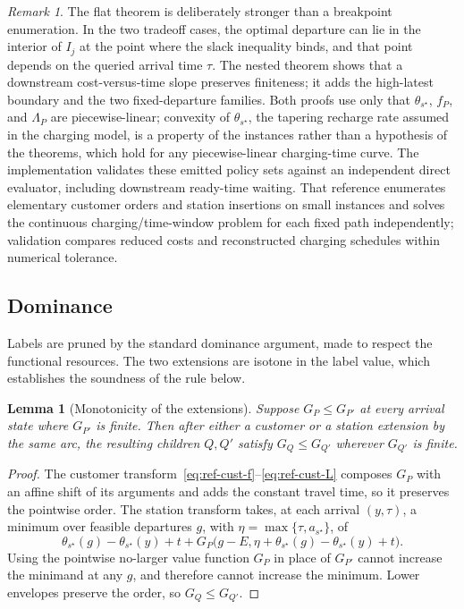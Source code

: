\documentclass[review,3p,authoryear]{elsarticle}
\theoremstyle{plain}
\newtheorem{lemma}{Lemma}
\theoremstyle{definition}
\theoremstyle{remark}
\newtheorem{remark}{Remark}
\begin{document}
\begin{remark}
The flat theorem is deliberately stronger than a breakpoint enumeration. In the two
tradeoff cases, the optimal departure can lie in the interior of $I_j$ at the point
where the slack inequality binds, and that point depends on the queried arrival time
$\tau$. The nested theorem shows that a downstream cost-versus-time slope preserves
finiteness; it adds the high-latest boundary and the two fixed-departure
families. Both proofs use only that $\theta_{s^\star}$, $f_P$, and $\Lambda_P$ are
piecewise-linear; convexity of $\theta_{s^\star}$, the tapering recharge rate assumed in
the charging model, is a property of the instances rather than a hypothesis of the
theorems, which hold for any piecewise-linear charging-time curve. The implementation
validates these emitted policy sets against an
independent direct evaluator, including downstream ready-time waiting. That
reference enumerates elementary customer orders and station insertions on small
instances and solves the continuous charging/time-window problem for each fixed
path independently; validation compares reduced costs and reconstructed charging
schedules within numerical tolerance.
\end{remark}

\subsection{Dominance}
\label{sec:dominance}

Labels are pruned by the standard dominance argument, made to respect the functional
resources. The two extensions are isotone in the label value, which establishes the
soundness of the rule below.

\begin{lemma}[Monotonicity of the extensions]
\label{lem:monotone}
Suppose $G_P\le G_{P'}$ at every arrival state where $G_{P'}$ is finite. Then after either
a customer or a station extension by the same arc, the resulting children $Q,Q'$ satisfy
$G_Q\le G_{Q'}$ wherever $G_{Q'}$ is finite.
\end{lemma}

\begin{proof}
The customer transform~\eqref{eq:ref-cust-f}--\eqref{eq:ref-cust-L} composes $G_P$ with an
affine shift of its arguments and adds the constant travel time, so it preserves the
pointwise order. The station transform takes, at each arrival $(y,\tau)$, a minimum over
feasible departures $g$, with $\eta=\max\{\tau,a_{s^\star}\}$, of
\[
\theta_{s^\star}(g)-\theta_{s^\star}(y)+t
+G_P\bigl(g-E,\eta+\theta_{s^\star}(g)-\theta_{s^\star}(y)+t\bigr).
\]
Using the pointwise no-larger value function $G_P$ in place of $G_{P'}$ cannot increase
the minimand at any $g$, and therefore cannot increase the minimum. Lower envelopes preserve
the order, so $G_Q\le G_{Q'}$.
\end{proof}
\end{document}
